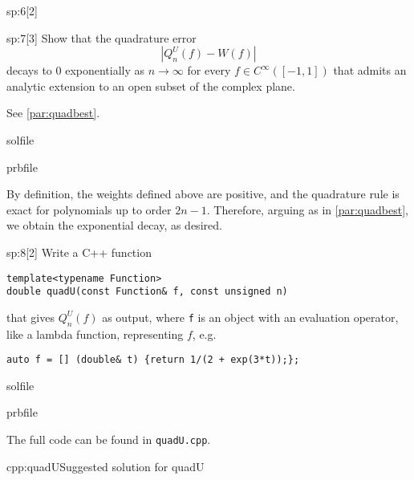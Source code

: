 \begin{samproblem}
\begin{subproblem}{sp:6}[2]
\end{subproblem}

\begin{subproblem}{sp:7}[3]
  Show that the quadrature error
  \begin{equation*}
    |Q^U_n(f)-W(f)|
  \end{equation*}
  decays to $0$ exponentially as $n\to \infty$ for every $f\in C^\infty([-1,1])$ that admits an analytic extension to an 
  open subset of the complex plane.

  \begin{samhint}
    See \cref{par:quadbest}.
  \end{samhint}

  \begin{samwriteprbpart}{solfile}
    \begin{writeverbatim}{prbfile}
      \begin{samsolution}
        By definition, the weights defined above are positive, and the quadrature rule is exact for polynomials up to order $2n-1$. 
        Therefore, arguing as in \cref{par:quadbest}, we obtain the exponential decay, as desired.
     \end{samsolution}
    \end{writeverbatim}
  \end{samwriteprbpart}

\end{subproblem}

\begin{subproblem}{sp:8}[2]
  Write a C++ function
  \begin{lstlisting}[style=cpp]
template<typename Function>
double quadU(const Function& f, const unsigned n)
  \end{lstlisting}
  that gives $Q^U_n(f)$ as output, where \texttt{f} is an object with an evaluation operator, like a lambda function, representing $f$, e.g.
  \begin{lstlisting}[style=cpp]
auto f = [] (double& t) {return 1/(2 + exp(3*t));};
  \end{lstlisting}

  \begin{samwriteprbpart}{solfile}
    \begin{writeverbatim}{prbfile}
      \begin{samsolution}
        The full code can be found in \texttt{quadU.cpp}.
        \begin{samcode}{cpp:quadU}{Suggested solution for quadU}
        \end{samcode}
     \end{samsolution}
    \end{writeverbatim}
  \end{samwriteprbpart}


\end{subproblem}
\end{samproblem}
